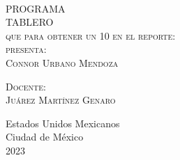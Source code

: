 \begin{titlepage}
\begin{minipage}[c][0.81\textheight][t]{0.75\textwidth}
\begin{center}
      {\color{red}{\large\scshape Titulo del Reporte }}\\[.2in]

      \vspace{2cm}            

      \textsc{\LARGE P\hspace{0.5cm}R\hspace{0.5cm}O\hspace{0.5cm}G\hspace{0.5cm}R\hspace{0.5cm}A\hspace{0.5cm}M\hspace{0.5cm}A\hspace{0.5cm}}\\[1cm]
      \textsc{\LARGE T\hspace{0.5cm}A\hspace{0.5cm}B\hspace{0.5cm}L\hspace{0.5cm}E\hspace{0.5cm}R\hspace{0.5cm}O}\\[1cm]
      \textsc{\large que para obtener un 10 en el reporte:}\\[0.2cm]
      
      {\color{red}\textsc{\large presenta:}}\\[0.2cm]
      \textsc{\large {Connor Urbano Mendoza}}\\[1cm]          

      \vspace{0.5cm}

      {\large\scshape 
        {\color{red}Docente:}\\[0.3cm] {Juárez Martínez Genaro}}\\[.2in]

      \vspace{1cm}

      \large{Estados Unidos Mexicanos\\ 
        Ciudad de México\\
        2023}
    \end{center}
  \end{minipage}
\end{titlepage}
